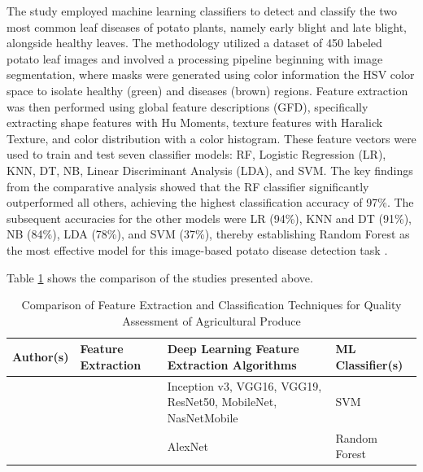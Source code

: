 {

The study employed machine learning classifiers to detect and classify the two most common leaf diseases of potato plants, namely early blight and late blight, alongside healthy leaves. The methodology utilized a dataset of 450 labeled potato leaf images and involved a processing pipeline beginning with image segmentation, where masks were generated using color information the HSV color space to isolate healthy (green) and diseases (brown) regions. Feature extraction was then performed using global feature descriptions (GFD), specifically extracting shape features with Hu Moments, texture features with Haralick Texture, and color distribution with a color histogram. These feature vectors were used to train and test seven classifier models: RF, Logistic Regression (LR), KNN, DT, NB, Linear Discriminant Analysis (LDA), and SVM. The key findings from the comparative analysis showed that the RF classifier significantly outperformed all others, achieving the highest classification accuracy of 97\%. The subsequent accuracies for the other models were LR (94\%), KNN and DT (91\%), NB (84\%), LDA (78\%), and SVM (37\%), thereby establishing Random Forest as the most effective model for this image-based potato disease detection task \citep{Iqbal2020}.

Table \ref{tab:relatedstudies_three} shows the comparison of the studies presented above. 

\begin{table}
	\centering
	\caption{Comparison of Feature Extraction and Classification Techniques for Quality Assessment of Agricultural Produce}
	\label{tab:relatedstudies_three}
	\begin{tabular}{
			>{\centering\arraybackslash}m{2.5cm} 
			>{\centering\arraybackslash}m{5cm}   
			>{\centering\arraybackslash}m{4.5cm} 
			>{\centering\arraybackslash}m{7cm}   
		}
		\toprule
		\textbf{Author(s)} & \textbf{Feature Extraction} & \textbf{Deep Learning Feature Extraction Algorithms} & \textbf{ML Classifier(s)} \\
		\midrule
		
		\citet{haque2022deepnetwork} &
		&
		Inception v3, VGG16, VGG19, ResNet50, MobileNet, NasNetMobile &
		SVM \\
		
		\citet{Kursun2025} &
		&
		AlexNet &
		Random Forest \\
		

\end{tabular}
\end{table}}
